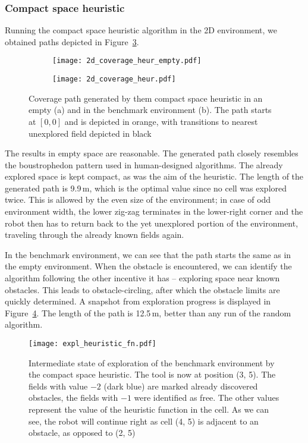 \documentclass[buriama8_dp.tex]{subfiles}
\begin{document}
\subsubsection{Compact space heuristic}
Running the compact space heuristic algorithm in the 2D environment, we obtained paths depicted in Figure~\ref{fig:heur_2d_coverage}.

\begin{figure}[htp]
  \centering
  \begin{subfigure}[t]{0.49\textwidth}
    \texttt{[image: 2d\_coverage\_heur\_empty.pdf]}
    \caption{}
    \label{fig:heur_2d_empty}
  \end{subfigure}
  \begin{subfigure}[t]{0.49\textwidth}
    \texttt{[image: 2d\_coverage\_heur.pdf]}
    \caption{}
    \label{fig:heur_2d_env}
  \end{subfigure}
  
  \caption[Coverage path -- compact space heuristic in 2D]{Coverage path generated by them compact space heuristic in an empty (a) and in the benchmark environment (b). The path starts at \([0,0]\) and is depicted in orange, with transitions to nearest unexplored field depicted in black}
  \label{fig:heur_2d_coverage}
\end{figure}

The results in empty space are reasonable. The generated path closely resembles the boustrophedon pattern used in human-designed algorithms. The already explored space is kept compact, as was the aim of the heuristic. The length of the generated path is 9.9\,m, which is the optimal value since no cell was explored twice. This is allowed by the even size of the environment; in case of odd environment width, the lower zig-zag terminates in the lower-right corner and the robot then has to return back to the yet unexplored portion of the environment, traveling through the already known fields again.

In the benchmark environment, we can see that the path starts the same as in the empty environment. When the obstacle is encountered, we can identify the algorithm following the other incentive it has -- exploring space near known obstacles. This leads to obstacle-circling, after which the obstacle limits are quickly determined. A snapshot from exploration progress is displayed in Figure~\ref{fig:heur_fn}. The length of the path is 12.5\,m, better than any run of the random algorithm.

\begin{figure}[htp]
  \centering
  \texttt{[image: expl\_heuristic\_fn.pdf]}
  \caption{Intermediate state of exploration of the benchmark environment by the compact space heuristic. The tool is now at position (3, 5). The fields with value \(-2\) (dark blue) are marked already discovered obstacles, the fields with \(-1\) were identified as free. The other values represent the value of the heuristic function in the cell. As we can see, the robot will continue right as cell (4, 5) is adjacent to an obstacle, as opposed to (2, 5)}
  \label{fig:heur_fn}
\end{figure}
\end{document}
